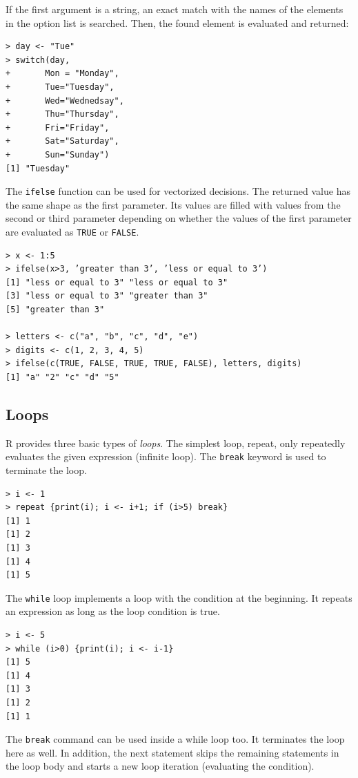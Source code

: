 If the first argument is a string, an exact match with the names of the elements
in the option list is searched. Then, the found element is evaluated and returned:

\begin{verbatim}
> day <- "Tue"
> switch(day,
+       Mon = "Monday",
+       Tue="Tuesday",
+       Wed="Wednedsay",
+       Thu="Thursday",
+       Fri="Friday",
+       Sat="Saturday",
+       Sun="Sunday")
[1] "Tuesday"
\end{verbatim}

The \texttt{ifelse} function can be used for vectorized decisions. The returned value
has the same shape as the first parameter. Its values are filled with values from the
second or third parameter depending on whether the values of the first parameter
are evaluated as \texttt{TRUE} or \texttt{FALSE}.

\begin{verbatim}
> x <- 1:5
> ifelse(x>3, ’greater than 3’, ’less or equal to 3’)
[1] "less or equal to 3" "less or equal to 3"
[3] "less or equal to 3" "greater than 3"
[5] "greater than 3"

> letters <- c("a", "b", "c", "d", "e")
> digits <- c(1, 2, 3, 4, 5)
> ifelse(c(TRUE, FALSE, TRUE, TRUE, FALSE), letters, digits)
[1] "a" "2" "c" "d" "5"
\end{verbatim}

\subsection{Loops}

R provides three basic types of \textit{loops}. The simplest loop, repeat, only repeatedly evaluates the given expression (infinite loop). The \texttt{break} keyword is used
to terminate the loop.

\begin{verbatim}
> i <- 1
> repeat {print(i); i <- i+1; if (i>5) break}
[1] 1
[1] 2
[1] 3
[1] 4
[1] 5
\end{verbatim}

The \texttt{while} loop implements a loop with the condition at the beginning. It
repeats an expression as long as the loop condition is true.

\begin{verbatim}
> i <- 5
> while (i>0) {print(i); i <- i-1}
[1] 5
[1] 4
[1] 3
[1] 2
[1] 1
\end{verbatim}

The \texttt{break} command can be used inside a while loop too. It terminates the
loop here as well. In addition, the next statement skips the remaining statements
in the loop body and starts a new loop iteration (evaluating the condition).

